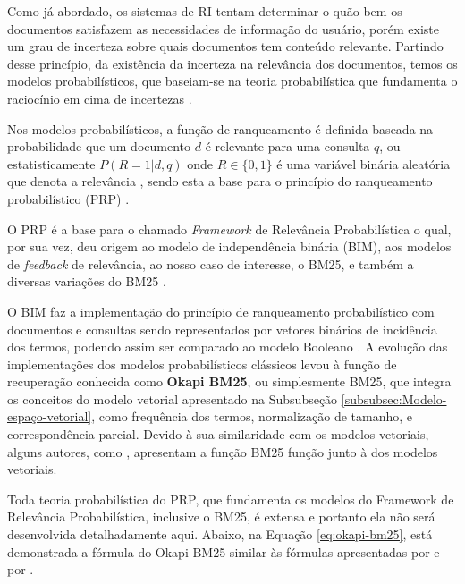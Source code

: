         Como já abordado, os sistemas de RI tentam determinar o quão bem os documentos satisfazem as necessidades de informação do usuário, porém existe um grau de incerteza sobre quais documentos tem conteúdo relevante. 
        Partindo desse princípio, da existência da incerteza na relevância dos documentos, temos os modelos probabilísticos, que baseiam-se na teoria probabilística que fundamenta o raciocínio em cima de incertezas \cite[p.~201]{Manning2008IIR}. 
        
        Nos modelos probabilísticos, a função de ranqueamento é definida baseada na probabilidade que um documento $d$ é relevante para uma consulta $q$, ou estatisticamente $P(R = 1| d,q)$ onde $R \in \{0, 1\}$ é uma variável binária aleatória que denota a relevância \cite[p.~111--112]{Zhai2016TDMA}, sendo esta a base para o princípio do ranqueamento probabilístico (PRP) \cite[p.~203]{Manning2008IIR}.
        
        O PRP é a base para o chamado \textit{Framework} de Relevância Probabilística o qual, por sua vez, deu origem ao modelo de independência binária (BIM), aos modelos de \textit{feedback} de relevância, ao nosso caso de interesse, o BM25, e também a diversas variações do BM25 \cite[p.~333]{robertson_probabilistic_2010}. 
        
        O BIM faz a implementação do princípio de ranqueamento probabilístico com documentos e consultas sendo representados por vetores binários de incidência dos termos, podendo assim ser comparado ao modelo Booleano \cite[p.~204]{Manning2008IIR}.
        A evolução das implementações dos modelos probabilísticos clássicos levou à função de recuperação conhecida como \textbf{Okapi BM25}, ou simplesmente BM25, que integra os conceitos do modelo vetorial apresentado na Subsubseção \ref{subsubsec:Modelo-espaço-vetorial}, como frequência dos termos, normalização de tamanho, e correspondência parcial.
        Devido à sua similaridade com os modelos vetoriais, alguns autores, como , apresentam a função BM25 função junto à dos modelos vetoriais.
        
        Toda teoria probabilística do PRP, que fundamenta os modelos do Framework de Relevância Probabilística, inclusive o BM25, é extensa e portanto ela não será  desenvolvida detalhadamente aqui.
        Abaixo, na Equação \ref{eq:okapi-bm25}, está demonstrada a fórmula do Okapi BM25 similar às fórmulas apresentadas por  e por .
        
